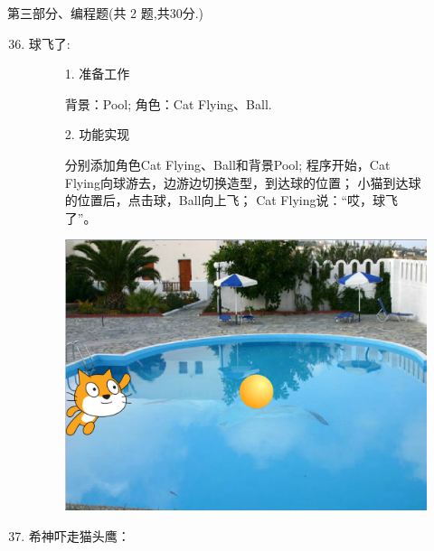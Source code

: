\documentclass[10pt, a4paper]{article}
\begin{document}
    \newpage
    {\noindent\heiti 第三部分、编程题(共 2 题,共30分.)}
    \begin{enumerate}
        \setcounter{enumi}{35}
        
        \item 球飞了:
        \begin{figure}[htbp]
            \begin{minipage}{.6\textwidth}
                1. 准备工作
                \begin{tasks}[label = (\arabic*)]
                    \task 背景：Pool;
                    \task 角色：Cat Flying、Ball.
                \end{tasks}
                2. 功能实现
                \begin{tasks}[label = (\arabic*)]
                    \task 分别添加角色Cat Flying、Ball和背景Pool;
                    \task 程序开始，Cat Flying向球游去，边游边切换造型，到达球的位置；
                    \task 小猫到达球的位置后，点击球，Ball向上飞；
                    \task Cat Flying说：“哎，球飞了”。
                \end{tasks}
            \end{minipage}
            \begin{minipage}{.37\textwidth}
                \centering
                \includegraphics[width=\textwidth]{36.png}
            \end{minipage}
        \end{figure}
            
        \item 希神吓走猫头鹰：
        

\end{enumerate}
\end{document}

